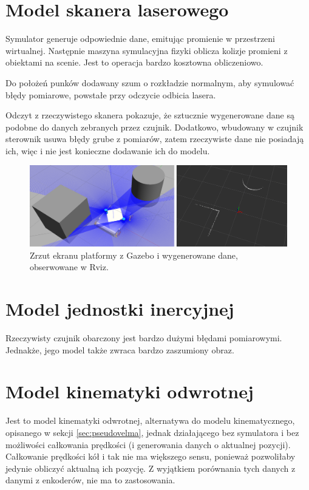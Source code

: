 \section{Model skanera laserowego}
	\label{sec:monokl}
	Symulator generuje odpowiednie dane, emitując promienie w przestrzeni wirtualnej.
	Następnie maszyna symulacyjna fizyki oblicza kolizje promieni z obiektami na scenie.
	Jest to operacja bardzo kosztowna obliczeniowo.
	
	Do położeń punków dodawany szum o rozkładzie normalnym, aby symulować błędy pomiarowe, powstałe przy odczycie odbicia lasera.
	
	Odczyt z rzeczywistego skanera pokazuje, że sztucznie wygenerowane dane są podobne do danych zebranych przez czujnik.
	Dodatkowo, wbudowany w czujnik sterownik usuwa błędy grube z pomiarów, zatem rzeczywiste dane nie posiadają ich, więc i nie jest konieczne dodawanie ich do modelu.
	
	\begin{figure}[h]
	\centering
	\includegraphics[width=\textwidth]{graphics/scan.png}
	\caption{Zrzut ekranu platformy z Gazebo i wygenerowane dane, obserwowane w Rviz.}
	\label{fig:scan}
	\end{figure}
	
\section{Model jednostki inercyjnej}
	Rzeczywisty czujnik obarczony jest bardzo dużymi błędami pomiarowymi.
	Jednakże, jego model także zwraca bardzo zaszumiony obraz.
	
\section{Model kinematyki odwrotnej}
	\label{sec:transmutator}
	Jest to model kinematyki odwrotnej, alternatywa do modelu kinematycznego, opisanego w sekcji \ref{sec:pseudovelma}, jednak działającego bez symulatora i bez możliwości 
	całkowania prędkości (i generowania danych o aktualnej pozycji).
	Całkowanie prędkości kół i tak nie ma większego sensu, ponieważ pozwoliłaby jedynie obliczyć aktualną ich pozycję.
	Z wyjątkiem porównania tych danych z danymi z enkoderów, nie ma to zastosowania.
	
